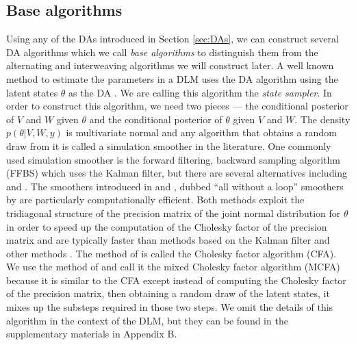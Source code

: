\documentclass[12pt]{article}
\begin{document}
\subsection{Base algorithms}\label{sec:Algs:base}
Using any of the DAs introduced in Section \ref{sec:DAs}, we can construct several DA algorithms which we call {\it base algorithms} to distinguish them from the alternating and interweaving algorithms we will construct later. A well known method to estimate the parameters in a DLM uses the DA algorithm using the latent states $\theta$ as the DA \citep{fruhwirth1994data,carter1994gibbs}. We are calling this algorithm the {\it state sampler}. In order to construct this algorithm, we need two pieces --- the conditional posterior of $V$ and $W$ given $\theta$ and the conditional posterior of $\theta$ given $V$ and $W$. The density $p(\theta|V,W,y)$ is multivariate normal and any algorithm that obtains a random draw from it is called a simulation smoother in the literature. One commonly used simulation smoother is the forward filtering, backward sampling algorithm (FFBS) \citep{fruhwirth1994data,carter1994gibbs} which uses the Kalman filter, but there are several alternatives including \citet{koopman1993disturbance} and \citet{de1995simulation}. The smoothers introduced in \citet{mccausland2011simulation} and \citet{rue2001fast}, dubbed ``all without a loop'' smoothers by \citet{kastner2013ancillarity} are particularly computationally efficient. Both methods exploit the tridiagonal structure of the precision matrix of the joint normal distribution for $\theta$ in order to speed up the computation of the Cholesky factor of the precision matrix and are typically faster than methods based on the Kalman filter and other methods \citep{mccausland2011simulation}. The method of \citet{rue2001fast} is called the Cholesky factor algorithm (CFA). We use the method of \citet{mccausland2011simulation} and call it the mixed Cholesky factor algorithm (MCFA) because it is similar to the CFA except instead of computing the Cholesky factor of the precision matrix, then obtaining a random draw of the latent states, it mixes up the substeps required in those two steps. We omit the details of this algorithm in the context of the DLM, but they can be found in the supplementary materials in Appendix B.
\end{document}

